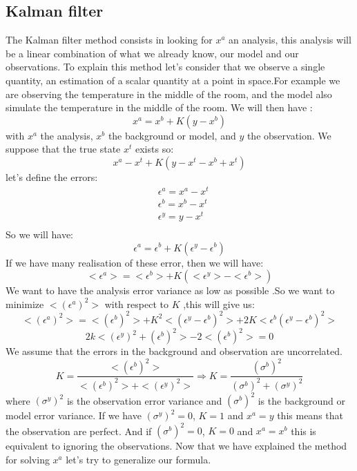 \documentclass{article}
\begin{document}
\subsection{Kalman filter}
The Kalman filter method consists in looking for $x^a$ an analysis, this analysis will be a linear combination of what we already know, our model and our observations.
To explain this method let's consider that we observe a single quantity, an estimation of a scalar quantity at a point in space.For example we are observing the temperature in the middle of the room, and the model also simulate the temperature in the middle of the room.  We will then have :
$$x^a=x^b+K(y-x^b)$$
with $x^a$ the analysis, $x^b$ the background or model, and $y$ the observation. 
We suppose that the true state $x^t$ exists so:
$$x^a-x^t+K(y-x^t-x^b+x^t)$$
let's define the errors:
$$\begin{aligned}
&\epsilon^a=x^a-x^t \\
&\epsilon^b=x^b-x^t \\
&\epsilon^y=y-x^t \\
\end{aligned}$$
So we will have:
$$\epsilon^a=\epsilon^b+K(\epsilon^y-\epsilon^b)$$
If we have many realisation of these error, then we will have:
$$<\epsilon^a>=<\epsilon^b>+K(<\epsilon^y>-<\epsilon^b>)$$
We want to have the analysis error variance as low as possible .So we want to minimize $<(\epsilon^a)^2>$ with respect to $K$ ,this will give us:
$$<(\epsilon^a)^2>=<(\epsilon^b)^2>+K^2<(\epsilon^y-\epsilon^b)^2>+2K<\epsilon^b(\epsilon^y-\epsilon^b)^2>$$
$$2k<(\epsilon^y)^2+(\epsilon^b)^2>-2<(\epsilon^b)^2>=0$$
\noindent We assume that the errors in the background and observation are uncorrelated.
$$K=\frac{<(\epsilon^b)^2>}{<(\epsilon^b)^2>+<(\epsilon^y)^2>} \Rightarrow K=\frac{(\sigma^b)^2}{(\sigma^b)^2+(\sigma^y)^2} $$
where $(\sigma^y)^2$ is the observation error variance and $(\sigma^b)^2$ is the background or model error variance.
\newline\noindent If we have $(\sigma^y)^2=0$, $K=1$ and $x^a=y$  this means that the observation are perfect.
\newline\noindent And if $(\sigma^b)^2=0$, $K=0$ and $x^a=x^b$ this is equivalent to ignoring the observations.
\vspace*{5mm}
\newline Now that we have explained the method for solving $x^a$ let's try to generalize our formula.
\end{document}
